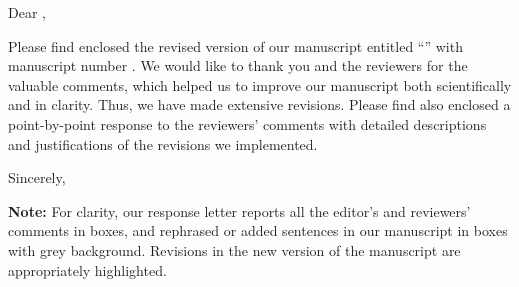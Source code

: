 Dear \theeditor,

Please find enclosed the revised version of our manuscript entitled \enquote{\thetitle} with manuscript number \themanuscript. We would like to thank you and the reviewers for the valuable comments, which helped us to improve our manuscript both scientifically and in clarity. Thus, we have made extensive revisions. Please find also enclosed a point-by-point response to the reviewers' comments with detailed descriptions and justifications of the revisions we implemented.

\vspace{1.2em}

Sincerely,

\vspace{1.7em}

\theauthor

\vfil
\textbf{Note:} For clarity, our response letter reports all the editor's and reviewers' comments in boxes, and rephrased or added sentences in our manuscript in boxes with grey background. Revisions in the new version of the manuscript are appropriately highlighted.